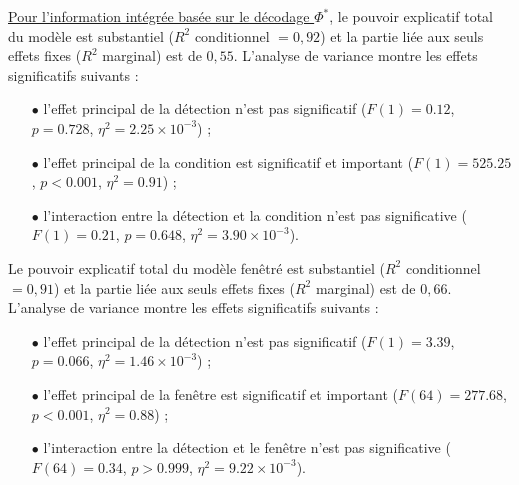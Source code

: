 \underline{Pour l'information intégrée basée sur le décodage $\Phi^{*}$}, le pouvoir explicatif total du modèle est substantiel ($R^2$ conditionnel $=0,92$) et la partie liée aux seuls effets fixes ($R^2$ marginal) est de $0,55$. 
L'analyse de variance montre les effets significatifs suivants : 
\begin{itemize}
\item[$\bullet$] l'effet principal de la détection n'est pas significatif ($F(1)=0.12$, $p=0.728$, $\eta^2=2.25\times10^{-3}$) ; 
\item[$\bullet$] l'effet principal de la condition est significatif et important ($F(1)=525.25$, $p<0.001$, $\eta^2=0.91$) ; 
\item[$\bullet$] l'interaction entre la détection et la condition n'est pas significative ($F(1)=0.21$, $p=0.648$, $\eta^2=3.90\times10^{-3}$).
\end{itemize}
Le pouvoir explicatif total du modèle fenêtré est substantiel ($R^2$ conditionnel $=0,91$) et la partie liée aux seuls effets fixes ($R^2$ marginal) est de $0,66$. 
L'analyse de variance montre les effets significatifs suivants : 
\begin{itemize}
\item[$\bullet$] l'effet principal de la détection n'est pas significatif ($F(1)=3.39$, $p=0.066$, $\eta^2=1.46\times10^{-3}$) ; 
\item[$\bullet$] l'effet principal de la fenêtre est significatif et important ($F(64)=277.68$, $p<0.001$, $\eta^2=0.88$) ; 
\item[$\bullet$] l'interaction entre la détection et le fenêtre n'est pas significative ($F(64)=0.34$, $p>0.999$, $\eta^2=9.22\times10^{-3}$). \\
\end{itemize}

